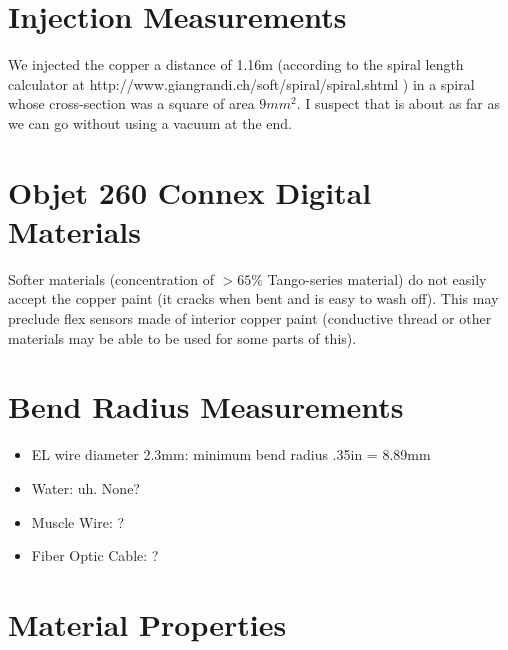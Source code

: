\newpage
\appendix
\section{Injection Measurements}
We injected the copper a distance of 1.16m (according to the spiral length calculator at http://www.giangrandi.ch/soft/spiral/spiral.shtml ) in a spiral whose cross-section was a square of area $9mm^2$.  I suspect that is about as far as we can go without using a vacuum at the end.

\section{Objet 260 Connex Digital Materials}
Softer materials (concentration of $> 65\%$ Tango-series material) do not easily accept the copper paint (it cracks when bent and is easy to wash off).  This may preclude flex sensors made of interior copper paint (conductive thread or other materials may be able to be used for some parts of this).

\section{Bend Radius Measurements}
\begin{itemize}
\item EL wire diameter 2.3mm: minimum bend radius .35in = 8.89mm
\item Water: uh.  None?
\item Muscle Wire: ?
\item Fiber Optic Cable: ?
\end{itemize}

\section{Material Properties}

